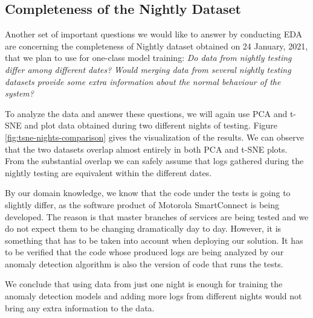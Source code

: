 \subsection{Completeness of the Nightly Dataset}
\label{assumption-completeness}

Another set of important questions we would like to answer by conducting EDA are concerning the completeness of Nightly dataset obtained on 24 January, 2021, that we plan to use for one-class model training: \textit{Do data from nightly testing differ among different dates?} \textit{Would merging data from several nightly testing datasets provide some extra information about the normal behaviour of the system?}

To analyze the data and answer these questions, we will again use PCA and t-SNE and plot data obtained during two different nights of testing. Figure \ref{fig:tsne-nights-comparison} gives the visualization of the results. We can observe that the two datasets overlap almost entirely in both PCA and t-SNE plots. From the substantial overlap we can safely assume that logs gathered during the nightly testing are equivalent within the different dates.

By our domain knowledge, we know that the code under the tests is going to slightly differ, as the software product of Motorola SmartConnect is being developed. The reason is that master branches of services are being tested and we do not expect them to be changing dramatically day to day. 
However, it is something that has to be taken into account when deploying our solution. It has to be verified that the code whose produced logs are being analyzed by our anomaly detection algorithm is also the version of code that runs the tests.

We conclude that using data from just one night is enough for training the anomaly detection models and adding more logs from different nights would not bring any extra information to the data. 

